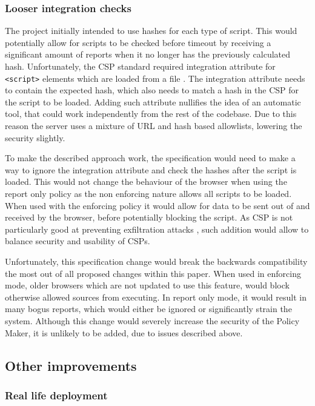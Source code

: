 \subsubsection{Looser integration checks}

The project initially intended to use hashes for each type of script. 
This would potentially allow for scripts to be checked before timeout by receiving a significant amount of reports when it no longer has the previously calculated hash.
Unfortunately, the CSP standard required integration attribute for \texttt{<script>} elements which are loaded from a file \cite{externalHash}.
The integration attribute needs to contain the expected hash, which also needs to match a hash in the CSP for the script to be loaded.
Adding such attribute nullifies the idea of an automatic tool, that could work independently from the rest of the codebase.
Due to this reason the server uses a mixture of URL and hash based allowlists, lowering the security slightly.

To make the described approach work, the specification would need to make a way to ignore the integration attribute and check the hashes after the script is loaded.
This would not change the behaviour of the browser when using the report only policy as the non enforcing nature allows all scripts to be loaded.
When used with the enforcing policy it would allow for data to be sent out of and received by the browser, before potentially blocking the script.
As CSP is not particularly good at preventing exfiltration attacks \cite{CSPexfil}, such addition would allow to balance security and usability of CSPs.

Unfortunately, this specification change would break the backwards compatibility the most out of all proposed changes within this paper.
When used in enforcing mode, older browsers which are not updated to use this feature, would block otherwise allowed sources from executing.
In report only mode, it would result in many bogus reports, which would either be ignored or significantly strain the system.
Although this change would severely increase the security of the Policy Maker, it is unlikely to be added, due to issues described above.

\subsection{Other improvements}

\subsubsection{Real life deployment}

